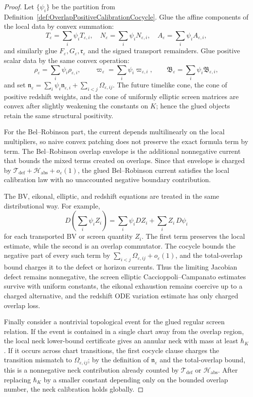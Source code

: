\begin{proof}
Let $\{\psi_i\}$ be the partition from Definition~\ref{def:OverlapPositiveCalibrationCocycle}. Glue the affine components of the local data by convex summation:
\[
    T_\varepsilon=\sum_i\psi_iT_{\varepsilon,i},\quad
    N_\varepsilon=\sum_i\psi_iN_{\varepsilon,i},\quad
    A_\varepsilon=\sum_i\psi_iA_{\varepsilon,i},
\]
and similarly glue $F_\varepsilon,G_\varepsilon,\mathfrak r_\varepsilon$ and the signed transport remainders. Glue positive scalar data by the same convex operation:
\[
    \rho_\varepsilon=\sum_i\psi_i\rho_{\varepsilon,i},\qquad
    \varpi_\varepsilon=\sum_i\psi_i\varpi_{\varepsilon,i},\qquad
    \mathfrak B_\varepsilon=\sum_i\psi_i\mathfrak B_{\varepsilon,i},
\]
and set $\mathfrak n_\varepsilon=\sum_i\psi_i\mathfrak n_{\varepsilon,i}+\sum_{i<j}\Omega_{\varepsilon,ij}$. The future timelike cone, the cone of positive redshift weights, and the cone of uniformly elliptic screen matrices are convex after slightly weakening the constants on $K$; hence the glued objects retain the same structural positivity.

For the Bel--Robinson part, the current depends multilinearly on the local multipliers, so naive convex patching does not preserve the exact formula term by term. The Bel--Robinson overlap envelope is the additional nonnegative current that bounds the mixed terms created on overlaps. Since that envelope is charged by $\mathcal T_{\mathrm{def}}+\mathcal H_{\mathrm{abs}}+o_\varepsilon(1)$, the glued Bel--Robinson current satisfies the local calibration law with no unaccounted negative boundary contribution.

The BV, eikonal, elliptic, and redshift equations are treated in the same distributional way. For example,
\[
    D\!\left(\sum_i\psi_i Z_i\right)
    =
    \sum_i\psi_i DZ_i+\sum_i Z_i\,D\psi_i
\]
for each transported BV or screen quantity $Z_i$. The first term preserves the local estimate, while the second is an overlap commutator. The cocycle bounds the negative part of every such term by $\sum_{i<j}\Omega_{\varepsilon,ij}+o_\varepsilon(1)$, and the total-overlap bound charges it to the defect or horizon currents. Thus the limiting Jacobian defect remains nonnegative, the screen elliptic Caccioppoli--Campanato estimates survive with uniform constants, the eikonal exhaustion remains coercive up to a charged alternative, and the redshift ODE variation estimate has only charged overlap loss.

Finally consider a nontrivial topological event for the glued regular screen relation. If the event is contained in a single chart away from the overlap region, the local neck lower-bound certificate gives an annular neck with mass at least $\hbar_K$. If it occurs across chart transitions, the first cocycle clause charges the transition mismatch to $\Omega_{\varepsilon,ij}$; by the definition of $\mathfrak n_\varepsilon$ and the total-overlap bound, this is a nonnegative neck contribution already counted by $\mathcal T_{\mathrm{def}}$ or $\mathcal H_{\mathrm{abs}}$. After replacing $\hbar_K$ by a smaller constant depending only on the bounded overlap number, the neck calibration holds globally.


\end{proof}
